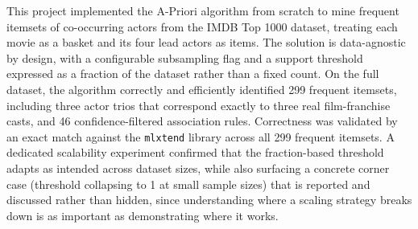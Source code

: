\documentclass[11pt,a4paper]{article}
\begin{document}
This project implemented the A-Priori algorithm from scratch to mine frequent
itemsets of co-occurring actors from the IMDB Top 1000 dataset, treating each
movie as a basket and its four lead actors as items. The solution is
data-agnostic by design, with a configurable subsampling flag and a support
threshold expressed as a fraction of the dataset rather than a fixed count.
On the full dataset, the algorithm correctly and efficiently identified 299
frequent itemsets, including three actor trios that correspond exactly to
three real film-franchise casts, and 46 confidence-filtered association
rules. Correctness was validated by an exact match against the
\texttt{mlxtend} library across all 299 frequent itemsets. A dedicated scalability experiment
confirmed that the fraction-based threshold adapts as intended across dataset
sizes, while also surfacing a concrete corner case (threshold collapsing to 1
at small sample sizes) that is reported and discussed rather than hidden,
since understanding where a scaling strategy breaks down is as important as
demonstrating where it works.
\end{document}
